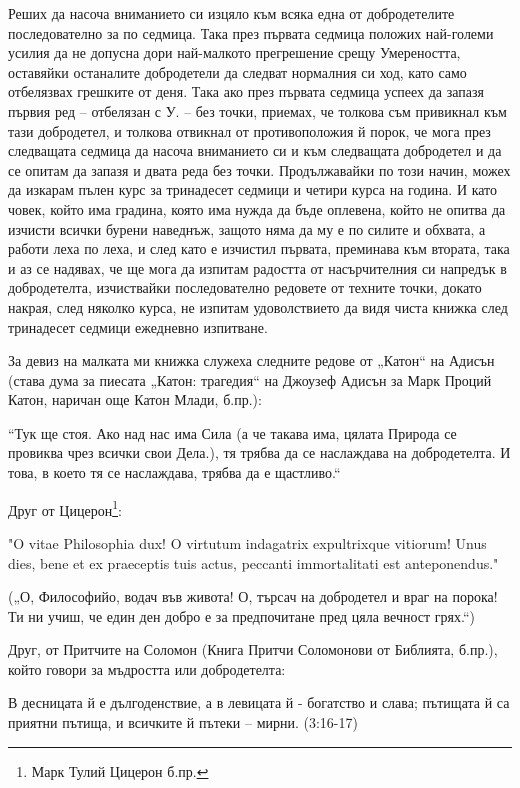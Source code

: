 \documentclass[12pt]{book}
\begin{document}
Реших да насоча вниманието си изцяло към всяка една от добродетелите последователно за по седмица. Така през първата седмица положих най-големи усилия да не допусна дори най-малкото прегрешение срещу Умереността, оставяйки останалите добродетели да следват нормалния си ход, като само отбелязвах грешките от деня. Така ако през първата седмица успеех да запазя първия ред – отбелязан с У. –  без точки, приемах, че толкова съм привикнал към тази добродетел, и толкова отвикнал от противоположия й порок, че мога през следващата седмица да насоча вниманието си и към следващата добродетел и да се опитам да запазя и двата реда без точки. Продължавайки по този начин, можех да изкарам пълен курс за тринадесет седмици и четири курса на година. И като човек, който има градина, която има нужда да бъде оплевена, който не опитва да изчисти всички бурени наведнъж, защото няма да му е по силите и обхвата, а работи леха по леха, и след като е изчистил първата, преминава към втората, така и аз се надявах, че ще мога да изпитам радостта от насърчителния си напредък в добродетелта, изчиствайки последователно редовете от техните точки, докато накрая, след няколко курса, не изпитам удоволствието да видя чиста книжка след тринадесет седмици ежедневно изпитване. 

За девиз на малката ми книжка служеха следните редове от „Катон“ на Адисън (става дума за пиесата „Катон: трагедия“ на Джоузеф Адисън за Марк Проций Катон, наричан още Катон Млади, б.пр.):

    “Тук ще стоя. Ако над нас има Сила
    (а че такава има, цялата Природа се провиква
    чрез всички свои Дела.), тя трябва да се наслаждава на добродетелта.
    И това, в което тя се наслаждава, трябва да е щастливо.“ 

Друг от Цицерон\footnote{Марк Тулий Цицерон б.пр.}: 

          "O vitae Philosophia dux! O virtutum indagatrix
          expultrixque vitiorum! Unus dies, bene et ex praeceptis
          tuis actus, peccanti immortalitati est anteponendus."

(„О, Философийо, водач във живота! О, търсач на добродетел 
и враг на порока! Ти ни учиш, че един ден добро е за предпочитане
пред цяла вечност грях.“)

Друг, от Притчите на Соломон (Книга Притчи Соломонови от Библията, б.пр.), който говори за мъдростта или добродетелта:

В десницата й е дългоденствие, а в левицата й - богатство и слава; пътищата й са приятни пътища, и всичките й пътеки – мирни. (3:16-17)
\end{document}
